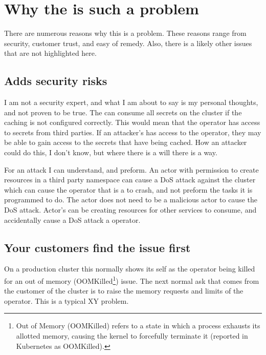 
\section{Why the \nn{} is such a problem}
\label{sec:why:problem}

There are numerous reasons why this is a problem.
These reasons range from security, customer trust, and easy of remedy.
Also, there is a likely other issues that are not highlighted here.

\subsection{Adds security risks}
I am not a security expert, and what I am about to say is my personal thoughts, and not proven to be true.
The \nn{} can consume all secrets on the cluster if the caching is not configured correctly.
This would mean that the operator has access to secrets from third parties.
If an attacker's has access to the operator, they may be able to gain access to the secrets that have being cached.
How an attacker could do this, I don't know, but where there is a will there is a way.

For an attack I can understand, and preform.
An actor with permission to create resources in a third party namespace can cause a DoS attack\cite{noauthor_denial--service_2026} against the cluster which can cause the operator that is a \nn{} to crash, and not preform the tasks it is programmed to do.
The actor does not need to be a malicious actor to cause the DoS attack.
Actor's can be creating resources for other services to consume, and accidentally cause a DoS attack a \nn{} operator.

\subsection{Your customers find the issue first}
On a production cluster this normally shows its self as the operator being killed for an out of memory (OOMKilled\footnote{Out of Memory (OOMKilled) refers to a state in which a process exhausts its allotted memory, causing the kernel to forcefully terminate it (reported in Kubernetes as OOMKilled).}) issue.
The next normal ask that comes from the customer of the cluster is to raise the memory requests and limits\cite{noauthor_resource_nodate} of the operator.
This is a typical XY problem.\cite{noauthor_xy_2026}

